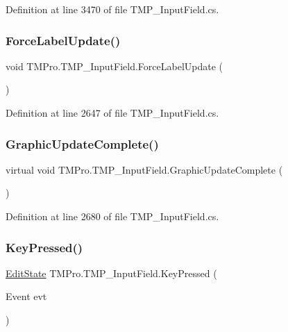 Definition at line 3470 of file T\+M\+P\+\_\+\+Input\+Field.\+cs.

\mbox{\label{class_t_m_pro_1_1_t_m_p___input_field_aa9dfe88bdbfa9c6490c14833711d604f}} 
\subsubsection{\texorpdfstring{ForceLabelUpdate()}{ForceLabelUpdate()}}
{\footnotesize\ttfamily void T\+M\+Pro.\+T\+M\+P\+\_\+\+Input\+Field.\+Force\+Label\+Update (\begin{DoxyParamCaption}{ }\end{DoxyParamCaption})}



Definition at line 2647 of file T\+M\+P\+\_\+\+Input\+Field.\+cs.

\mbox{\label{class_t_m_pro_1_1_t_m_p___input_field_a89a96f3d5ff67619b0c24c9cec50859d}} 
\subsubsection{\texorpdfstring{GraphicUpdateComplete()}{GraphicUpdateComplete()}}
{\footnotesize\ttfamily virtual void T\+M\+Pro.\+T\+M\+P\+\_\+\+Input\+Field.\+Graphic\+Update\+Complete (\begin{DoxyParamCaption}{ }\end{DoxyParamCaption})\hspace{0.3cm}{\ttfamily [virtual]}}



Definition at line 2680 of file T\+M\+P\+\_\+\+Input\+Field.\+cs.

\mbox{\label{class_t_m_pro_1_1_t_m_p___input_field_a9ef972ef2261f10383fd4a900a9c3449}} 
\subsubsection{\texorpdfstring{KeyPressed()}{KeyPressed()}}
{\footnotesize\ttfamily \mbox{\hyperlink{class_t_m_pro_1_1_t_m_p___input_field_a12fc070748fd5c39cbb8c907aa3145ee}{Edit\+State}} T\+M\+Pro.\+T\+M\+P\+\_\+\+Input\+Field.\+Key\+Pressed (\begin{DoxyParamCaption}\item[{Event}]{evt }\end{DoxyParamCaption})\hspace{0.3cm}{\ttfamily [protected]}}



